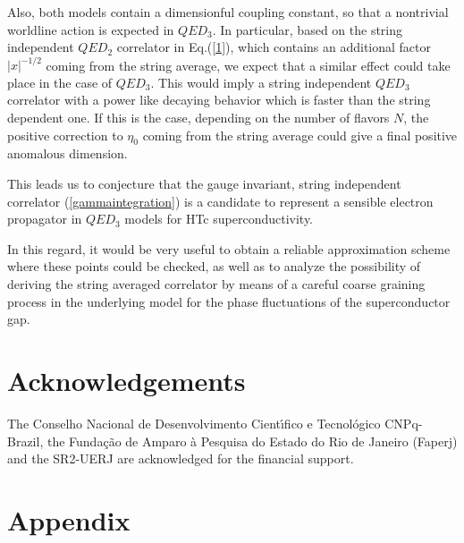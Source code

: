 \documentclass[a4paper,12pt]{article}
\begin{document}
Also, both models contain a dimensionful coupling constant, so that a nontrivial worldline action is expected in $QED_3$. In particular, based on the string independent $QED_2$ correlator in Eq.(\ref{1}), which contains an additional factor $|x|^{-1/2}$ coming from the string average, we expect that a similar effect could take place in the case of $QED_3$. This would imply a string independent $QED_3$ correlator with a power like decaying behavior which is faster than the string dependent one. If this is the case, depending on the number of flavors $N$, the positive correction to $\eta_0$ coming from the string average could give a final positive anomalous dimension.

This leads us to conjecture that the gauge invariant, string independent correlator (\ref{gammaintegration}) is a candidate to represent a sensible electron propagator in $QED_3$ models for HTc superconductivity.
 
In this regard, it would be very useful to obtain a reliable approximation scheme where these points could be checked, as well as to analyze the possibility of deriving the string averaged correlator by means of a careful coarse graining process in the underlying model for the phase fluctuations of the superconductor gap.



\section*{Acknowledgements}

The Conselho Nacional de Desenvolvimento Cient\'{\i }fico e Tecnol\'{o}gico
CNPq-Brazil, the Funda{\c{c}}{\~{a}}o de Amparo {\`{a}} Pesquisa do Estado
do Rio de Janeiro (Faperj) and the SR2-UERJ are acknowledged for the
financial support.

\section*{Appendix}
\end{document}
